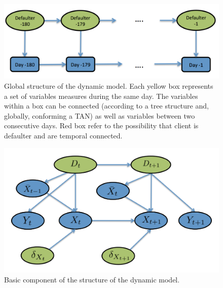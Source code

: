 \begin{figure}
\begin{center}
\includegraphics[scale=0.45]{./figures/CajaMarModel1}
\caption{Global structure of the dynamic model. Each yellow box represents a set of variables measures during the same day.
The variables within a box can be connected (according to a tree structure and, globally, conforming a TAN) as well as variables between two consecutive days. Red box refer to the possibility that 
client is defaulter and are temporal connected.}
\label{fig:global_temp}
\end{center}
\end{figure}

\begin{figure}
\begin{center}
\includegraphics[scale=0.45]{./figures/CajaMarModel2}
\caption{Basic component of the structure of the dynamic model.}
\label{fig:component}
\end{center}
\end{figure}


